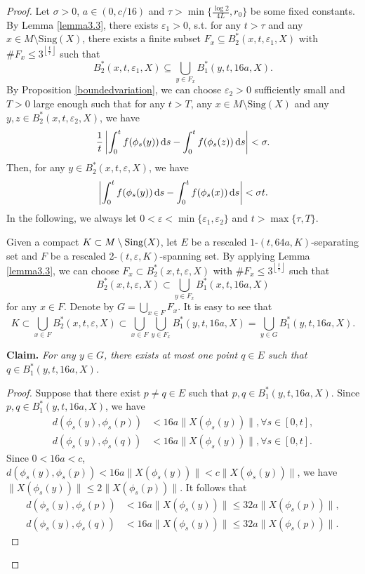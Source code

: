 \documentclass[10pt]{article}
\newtheorem*{Theorem A}{Theorem A}
\begin{document}
\begin{proof}
Let \( \sigma > 0 \), \(a\in(0,c/16)\) and  \( \tau > \min\{\frac{\log 2}{4L}, r_0\} \) be some fixed constants. By Lemma \ref{lemma3.3}, there exists \( \varepsilon_1> 0 \), s.t. for any \( t > \tau \) and any \( x \in M \setminus \text{Sing}(X) \), there exists a finite subset \( F_x \subseteq B_2^*(x, t, \varepsilon_1, X) \) with \( \#F_x \leq 3^{\left\lfloor \frac{t}{\tau} \right\rfloor} \) such that
\[
B_2^*(x, t, \varepsilon_1, X) \subseteq \bigcup_{y \in F_x} B_1^*(y, t, 16a, X).
\]
By Proposition \ref{boundedvariation}, we can choose \( \varepsilon_2> 0 \) sufficiently small and \( T>0\) large enough such that for any \( t > T \),  any \( x \in M \setminus \text{Sing}(X) \) and any \( y, z \in B_2^*(x, t, \varepsilon_2, X) \), we have
\[
\frac{1}{t}\left| \int_0^t f(\phi_s(y)) \, {\rm d}s - \int_0^t f(\phi_s(z)) \, {\rm d}s \right| < \sigma.
\]
Then, for any \( y \in B_2^*(x, t, \varepsilon, X) \), we have \[ \left| \int_0^t f(\phi_s(y)) \, {\rm d}s - \int_0^t f(\phi_s(x)) \, {\rm d}s \right| < \sigma t. \]
In the following, we always let $0<\varepsilon<\min \{\varepsilon_1, \varepsilon_2\}$ and $t>\max\{\tau, T\}$.

Given a compact \( K \subset M\setminus{\rm Sing}(X) \), let \( E \) be a rescaled \( 1\text{-}(t, 64a, K) \)-separating set and $F$ be a rescaled 2-$(t, \varepsilon, K)$-spanning set. By applying Lemma \ref{lemma3.3}, we can choose $F_x\subset B_2^*(x, t, \varepsilon, X)$ with $\#F_x \leq 3^{\left\lfloor \frac{t}{\tau} \right\rfloor}$ such that
$$B_2^*(x, t, \varepsilon, X)\subset \bigcup_{y\in F_x}B_1^*(x, t, 16a, X)$$
for any $x\in F$. Denote by $G=\bigcup\limits_{x\in F} F_x$. It is easy to see that
\[K \subset \bigcup_{x \in F} B_2^*(x, t, \varepsilon, X) \subset \bigcup_{x \in F} \bigcup_{y \in F_x} B_1^*(y, t, 16a, X) = \bigcup_{y \in G} B_1^*(y, t, 16a, X).
\]

\bigskip
\noindent\textbf{Claim. } {\it For any $y\in G$, there exists at most one point $q\in E$ such that $q\in B_1^*(y, t, 16a, X)$.}

\begin{proof} Suppose that there exist \( p \neq q \in E \) such that \( p, q \in B_1^*(y, t, 16a, X) \). Since \( p,q \in B_1^*(y, t, 16a, X) \), we have
\[
\begin{aligned}
d(\phi_s(y), \phi_s(p)) &< 16a \| X(\phi_s(y)) \| , \forall s \in [0, t], \\
d(\phi_s(y), \phi_s(q)) &< 16a \| X(\phi_s(y)) \| , \forall s \in [0, t] .
\end{aligned}
\]
Since \( 0<16a<c \), \( d(\phi_s(y), \phi_s(p)) < 16a \| X(\phi_s(y)) \|<c\|X(\phi_s(y))\| \), we have
\(
\| X(\phi_s(y)) \| \leq 2 \| X(\phi_s(p)) \|.\)
It follows that
\begin{align*}
d(\phi_s(y), \phi_s(p)) &< 16a \| X(\phi_s(y)) \| \leq 32a \| X(\phi_s(p)) \|, \\
d(\phi_s(y), \phi_s(q)) &< 16a \| X(\phi_s(y)) \| \leq 32a \| X(\phi_s(p)) \|.
\end{align*}


\end{proof}
\end{proof}
\end{document}
